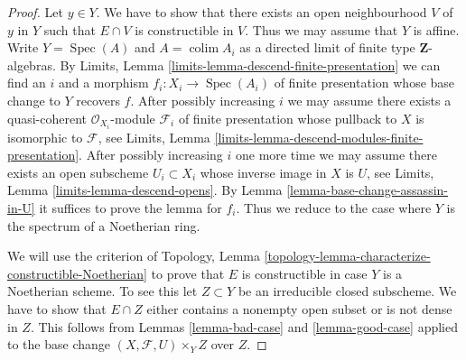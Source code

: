 \documentclass[10pt,a4paper]{amsart}
\theoremstyle{plain}
\theoremstyle{definition}
\theoremstyle{remark}
\numberwithin{equation}{subsection}
\def\colim{\mathop{\mathrm{colim}}\nolimits}
\def\Spec{\mathop{\mathrm{Spec}}}
\begin{document}
\begin{proof}
Let $y \in Y$. We have to show that there exists an open neighbourhood
$V$ of $y$ in $Y$ such that $E \cap V$ is constructible in $V$. Thus we may
assume that $Y$ is affine. Write $Y = \Spec(A)$ and
$A = \colim A_i$ as a directed limit of finite type
$\mathbf{Z}$-algebras. By
Limits, Lemma \ref{limits-lemma-descend-finite-presentation}
we can find an $i$ and a morphism $f_i : X_i \to \Spec(A_i)$ of
finite presentation whose base change to $Y$ recovers $f$.
After possibly increasing $i$ we may assume there exists a
quasi-coherent $\mathcal{O}_{X_i}$-module $\mathcal{F}_i$ of finite
presentation whose pullback to $X$ is isomorphic to $\mathcal{F}$, see
Limits, Lemma \ref{limits-lemma-descend-modules-finite-presentation}.
After possibly increasing $i$ one more time we may assume there exists
an open subscheme $U_i \subset X_i$ whose inverse image in $X$
is $U$, see
Limits, Lemma \ref{limits-lemma-descend-opens}.
By
Lemma \ref{lemma-base-change-assassin-in-U}
it suffices to prove the lemma for $f_i$. Thus we reduce to
the case where $Y$ is the spectrum of a Noetherian ring.

\medskip\noindent
We will use the criterion of
Topology, Lemma \ref{topology-lemma-characterize-constructible-Noetherian}
to prove that $E$ is constructible in case $Y$ is a Noetherian scheme.
To see this let $Z \subset Y$ be an irreducible closed subscheme.
We have to show that $E \cap Z$ either contains a nonempty open subset
or is not dense in $Z$. This follows from
Lemmas \ref{lemma-bad-case} and
\ref{lemma-good-case}
applied to the base change $(X, \mathcal{F}, U) \times_Y Z$ over $Z$.
\end{proof}
\end{document}
